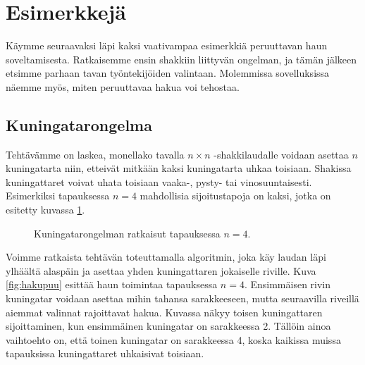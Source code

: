 \section{Esimerkkejä}

Käymme seuraavaksi läpi kaksi vaativampaa esimerkkiä
peruuttavan haun soveltamisesta.
Ratkaisemme ensin shakkiin liittyvän ongelman,
ja tämän jälkeen etsimme parhaan tavan
työntekijöiden valintaan.
Molemmissa sovelluksissa näemme myös,
miten peruuttavaa hakua voi tehostaa.

\subsection{Kuningatarongelma}

Tehtävämme on laskea, monellako tavalla
$n \times n$ -shakkilaudalle voidaan asettaa $n$ kuningatarta
niin, etteivät mitkään kaksi kuningatarta uhkaa toisiaan.
Shakissa kuningattaret voivat uhata toisiaan
vaaka-, pysty- tai vinosuuntaisesti.
Esimerkiksi tapauksessa $n=4$ mahdollisia sijoitustapoja on kaksi,
jotka on esitetty kuvassa \ref{fig:kuning}.

\begin{figure}
\center
{}
\caption{Kuningatarongelman ratkaisut tapauksessa $n=4$.}
\label{fig:kuning}
\end{figure}

Voimme ratkaista tehtävän toteuttamalla algoritmin,
joka käy laudan läpi ylhäältä alaspäin ja asettaa yhden kuningattaren
jokaiselle riville.
Kuva \ref{fig:hakupuu} esittää haun toimintaa tapauksessa $n=4$.
Ensimmäisen rivin kuningatar voidaan asettaa mihin tahansa sarakkeeseen,
mutta seuraavilla riveillä aiemmat valinnat rajoittavat hakua.
Kuvassa näkyy toisen kuningattaren sijoittaminen,
kun ensimmäinen kuningatar on sarakkeessa 2.
Tällöin ainoa vaihtoehto on, että toinen kuningatar on sarakkeessa 4,
koska kaikissa muissa tapauksissa kuningattaret uhkaisivat toisiaan.


